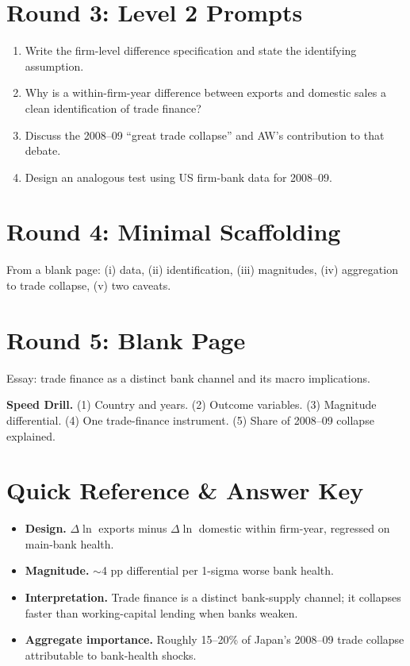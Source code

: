 \documentclass[11pt]{article}
\begin{document}
\section*{Round 3: Level 2 Prompts}
\begin{enumerate}
\item Write the firm-level difference specification and state the identifying assumption.
\item Why is a within-firm-year difference between exports and domestic sales a clean identification of trade finance?
\item Discuss the 2008--09 ``great trade collapse'' and AW's contribution to that debate.
\item Design an analogous test using US firm-bank data for 2008--09.
\end{enumerate}

\section*{Round 4: Minimal Scaffolding}
From a blank page: (i) data, (ii) identification, (iii) magnitudes, (iv) aggregation to trade collapse, (v) two caveats.

\section*{Round 5: Blank Page}
Essay: trade finance as a distinct bank channel and its macro implications.

\vspace{6pt}
\begin{drillbox}
\textbf{Speed Drill.} (1) Country and years. (2) Outcome variables. (3) Magnitude differential. (4) One trade-finance instrument. (5) Share of 2008--09 collapse explained.
\end{drillbox}

\section*{Quick Reference \& Answer Key}
\begin{answerbox}
\begin{itemize}
\item \textbf{Design.} $\Delta\ln$ exports minus $\Delta\ln$ domestic within firm-year, regressed on main-bank health.
\item \textbf{Magnitude.} $\sim$4 pp differential per 1-sigma worse bank health.
\item \textbf{Interpretation.} Trade finance is a distinct bank-supply channel; it collapses faster than working-capital lending when banks weaken.
\item \textbf{Aggregate importance.} Roughly 15--20\% of Japan's 2008--09 trade collapse attributable to bank-health shocks.
\end{itemize}
\end{answerbox}
\end{document}
